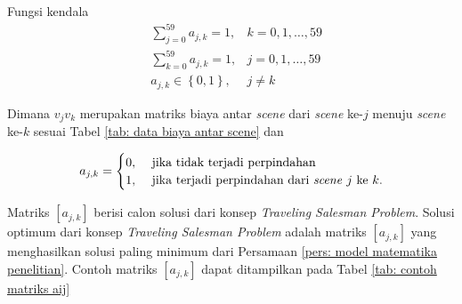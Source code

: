 {{\noindent
Fungsi kendala
\begin{equation*}
    \begin{aligned}
         & \sum^{59}_{j=0} a_{j,k} = 1,    & k = 0,1,\dots,59 \\
         & \sum^{59}_{k=0} a_{j,k} = 1,    & j = 0,1,\dots,59 \\
         & a_{j,k} \in \left\{0,1\right\}, & j \neq k
    \end{aligned}
\end{equation*}

\noindent
Dimana $v_{j}v_{k}$ merupakan matriks biaya antar \textit{scene} dari \textit{scene} ke-$j$ menuju \textit{scene} ke-$k$ sesuai Tabel \ref{tab: data biaya antar scene} dan

\begin{equation*}
    a_{j,k} =
    \begin{cases}
        0, & \text{ jika tidak terjadi perpindahan}                           \\
        1, & \text{ jika terjadi perpindahan dari \textit{scene} $j$ ke $k$.}
    \end{cases}
\end{equation*}

Matriks $[a_{j,k}]$ berisi calon solusi dari konsep \textit{Traveling Salesman Problem}.
Solusi optimum dari konsep \textit{Traveling Salesman Problem} adalah matriks $[a_{j,k}]$ yang menghasilkan solusi paling minimum dari Persamaan \ref{pers: model matematika penelitian}.
Contoh matriks $[a_{j,k}]$ dapat ditampilkan pada Tabel \ref{tab: contoh matriks aij}

}}
